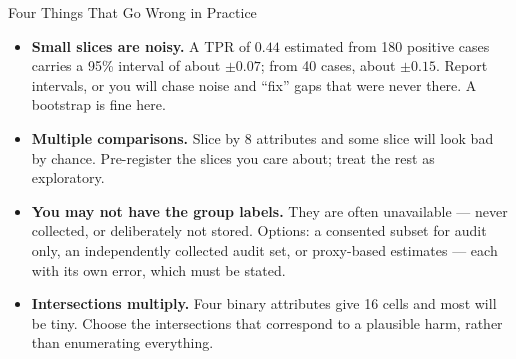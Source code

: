 
\begin{frame}{Four Things That Go Wrong in Practice}

    \begin{itemize}
        \setlength\itemsep{0.65em}
        \item \textbf{Small slices are noisy.} A TPR of $0.44$ estimated from 180 positive cases
              carries a 95\% interval of about $\pm 0.07$; from 40 cases, about $\pm 0.15$. Report
              intervals, or you will chase noise and ``fix'' gaps that were never there.
              A bootstrap is fine here.

        \item \textbf{Multiple comparisons.} Slice by 8 attributes and some slice will look bad by
              chance. Pre-register the slices you care about; treat the rest as exploratory.

        \item \textbf{You may not have the group labels.} They are often unavailable --- never
              collected, or deliberately not stored. Options: a consented subset for audit only, an
              independently collected audit set, or proxy-based estimates --- each with its own
              error, which must be stated.

        \item \textbf{Intersections multiply.} Four binary attributes give 16 cells and most will
              be tiny. Choose the intersections that correspond to a plausible harm, rather than
              enumerating everything.
    \end{itemize}
\end{frame}
